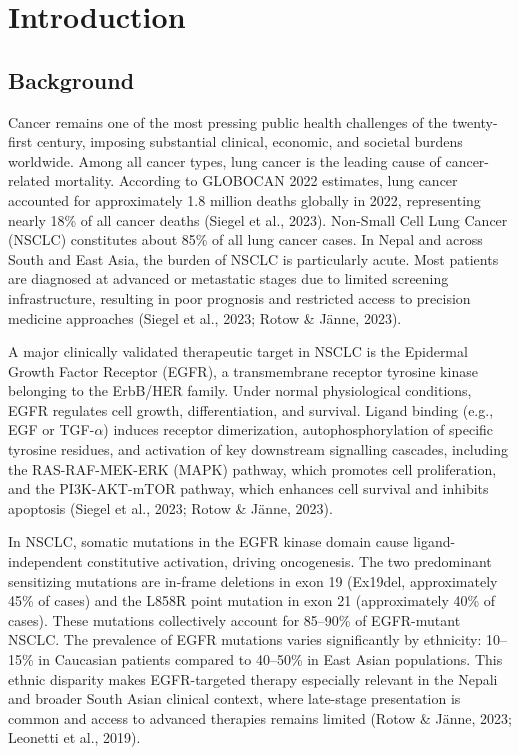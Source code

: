 \section{Introduction}

\subsection{Background}

Cancer remains one of the most pressing public health challenges of the twenty-first century, imposing substantial clinical, economic, and societal burdens worldwide. Among all cancer types, lung cancer is the leading cause of cancer-related mortality. According to GLOBOCAN 2022 estimates, lung cancer accounted for approximately 1.8 million deaths globally in 2022, representing nearly 18\% of all cancer deaths (Siegel et al., 2023). Non-Small Cell Lung Cancer (NSCLC) constitutes about 85\% of all lung cancer cases. In Nepal and across South and East Asia, the burden of NSCLC is particularly acute. Most patients are diagnosed at advanced or metastatic stages due to limited screening infrastructure, resulting in poor prognosis and restricted access to precision medicine approaches (Siegel et al., 2023; Rotow \& Jänne, 2023).

A major clinically validated therapeutic target in NSCLC is the Epidermal Growth Factor Receptor (EGFR), a transmembrane receptor tyrosine kinase belonging to the ErbB/HER family. Under normal physiological conditions, EGFR regulates cell growth, differentiation, and survival. Ligand binding (e.g., EGF or TGF-$\alpha$) induces receptor dimerization, autophosphorylation of specific tyrosine residues, and activation of key downstream signalling cascades, including the RAS-RAF-MEK-ERK (MAPK) pathway, which promotes cell proliferation, and the PI3K-AKT-mTOR pathway, which enhances cell survival and inhibits apoptosis (Siegel et al., 2023; Rotow \& Jänne, 2023). 

In NSCLC, somatic mutations in the EGFR kinase domain cause ligand-independent constitutive activation, driving oncogenesis. The two predominant sensitizing mutations are in-frame deletions in exon 19 (Ex19del, approximately 45\% of cases) and the L858R point mutation in exon 21 (approximately 40\% of cases). These mutations collectively account for 85--90\% of EGFR-mutant NSCLC. The prevalence of EGFR mutations varies significantly by ethnicity: 10--15\% in Caucasian patients compared to 40--50\% in East Asian populations. This ethnic disparity makes EGFR-targeted therapy especially relevant in the Nepali and broader South Asian clinical context, where late-stage presentation is common and access to advanced therapies remains limited (Rotow \& Jänne, 2023; Leonetti et al., 2019).

